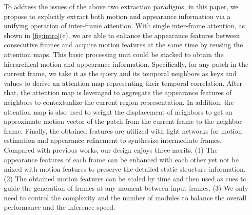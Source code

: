 \documentclass[10pt,twocolumn,letterpaper]{article}
\begin{document}
        To address the issues of the above two extraction paradigms, in this paper, we propose to explicitly extract both motion and appearance information via a unifying operation of inter-frame attention.
        With single inter-frame attention, as shown in \cref{fig:intro}(c), we are able to enhance the appearance features between consecutive frames and acquire motion features at the same time by reusing the attention maps. This basic processing unit could be stacked to obtain the hierarchical motion and appearance information. 
       Specifically, for any patch in the current frame, we take it as the query and its temporal neighbors as keys and values to derive an attention map representing their temporal correlation. After that, the attention map is leveraged to aggregate the appearance features of neighbors to contextualize the current region representation. In addition, the attention map is also used to weight the displacement of neighbors to get an approximate motion vector of the patch from the current frame to the neighbor frame. Finally, the obtained features are utilized with light networks for motion estimation and appearance refinement to synthesize intermediate frames.
       Compared with previous works, our design enjoys three merits. (1) The appearance features of each frame can be enhanced with each other yet not be mixed with motion features to preserve the detailed static structure information. (2) The obtained motion features can be scaled by time and then used as cues to guide the generation of frames at any moment between input frames.  (3) We only need to control the complexity and the number of modules to balance the overall performance and the inference speed.
\end{document}
